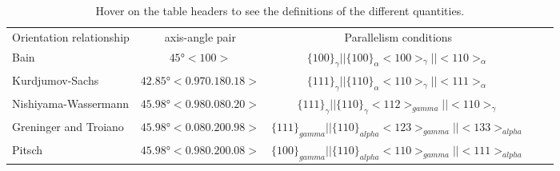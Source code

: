 
\begin{table*}
\caption{Hover on the table headers to see the definitions of the  different quantities.}
\label{table}
\begin{tabular}{l c | c c c }
\hline\hline
    Orientation relationship & axis-angle pair & Parallelism conditions \\
    Bain \cite{bain1924nature} & $45°<100>$ & $\{100\}_{\gamma} || \{100\}_{\alpha} <100>_{\gamma } || <110>_{\alpha}$ \\
    Kurdjumov-Sachs \cite{kurdjumow1930mechanismus} & $42.85°<0.970.180.18>$ & $\{111\}_{\gamma}||\{110\}_{\alpha} <110>_{\gamma}||<111>_{\alpha}$ \\
    Nishiyama-Wassermann \cite{nishiyama1934x,wassermann1935ueber} & $45.98° <0.98 0.08 0.20>$ & $\{111\}_{\gamma} || \{110\}_{\gamma} <112>_{gamma} || <110>_{\gamma}$ \\
    Greninger and Troiano \cite{greninger1949mechanism} & $45.98° <0.08 0.20 0.98>$ & $\{111\}_{gamma} || \{110\}_{alpha} <123>_{gamma} || <133>_{alpha}$ \\
    Pitsch \cite{pitsch1962orientierungszusammenhang} & $45.98° <0.98 0.20 0.08>$ & $\{100\}_{gamma} || \{110\}_{alpha} <110>_{gamma} || <111>_{alpha}$ \\
\hline
\end{tabular}
\end{table*}
